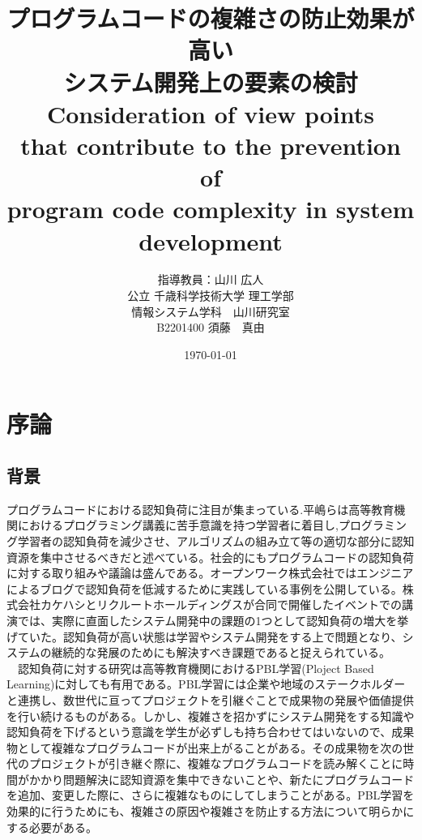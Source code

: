 \documentclass[11pt, a4paper]{jreport}
\begin{document}
    \title{プログラムコードの複雑さの防止効果が高い\\システム開発上の要素の検討\\Consideration of view points\\that contribute to the prevention of\\program code complexity in system development}
    \author{指導教員：山川 広人\\
    公立 千歳科学技術大学 理工学部\\
    情報システム学科　山川研究室\\
B2201400 須藤　真由}
\date{\today}

\maketitle
{}
\tableofcontents
\chapter{序論}

\section{背景}
プログラムコードにおける認知負荷に注目が集まっている.平嶋ら\cite{haikei}は高等教育機関におけるプログラミング講義に苦手意識を持つ学習者に着目し,プログラミング学習者の認知負荷を減少させ、アルゴリズムの組み立て等の適切な部分に認知資源を集中させるべきだと述べている。社会的にもプログラムコードの認知負荷に対する取り組みや議論は盛んである。オープンワーク株式会社ではエンジニアによるブログで認知負荷を低減するために実践している事例を公開している。株式会社カケハシとリクルートホールディングスが合同で開催したイベントでの講演では、実際に直面したシステム開発中の課題の1つとして認知負荷の増大を挙げていた。認知負荷が高い状態は学習やシステム開発をする上で問題となり、システムの継続的な発展のためにも解決すべき課題であると捉えられている。
\\　認知負荷に対する研究は高等教育機関におけるPBL学習(Ploject Based Learning)に対しても有用である。PBL学習には企業や地域のステークホルダーと連携し、数世代に亘ってプロジェクトを引継ぐことで成果物の発展や価値提供を行い続けるものがある。しかし、複雑さを招かずにシステム開発をする知識や認知負荷を下げるという意識を学生が必ずしも持ち合わせてはいないので、成果物として複雑なプログラムコードが出来上がることがある。その成果物を次の世代のプロジェクトが引き継ぐ際に、複雑なプログラムコードを読み解くことに時間がかかり問題解決に認知資源を集中できないことや、新たにプログラムコードを追加、変更した際に、さらに複雑なものにしてしまうことがある。PBL学習を効果的に行うためにも、複雑さの原因や複雑さを防止する方法について明らかにする必要がある。
\end{document}
